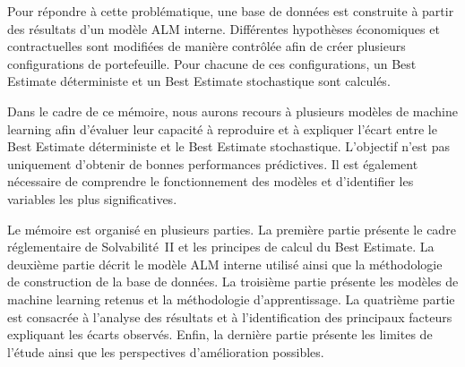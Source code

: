 Pour répondre à cette problématique, une base de données est construite à partir des résultats d'un modèle ALM interne. Différentes hypothèses économiques et contractuelles sont modifiées de manière contrôlée afin de créer plusieurs configurations de portefeuille. Pour chacune de ces configurations, un Best Estimate déterministe et un Best Estimate stochastique sont calculés.

Dans le cadre de ce mémoire, nous aurons recours à plusieurs modèles de machine learning afin d'évaluer leur capacité à reproduire et à expliquer l'écart entre le Best Estimate déterministe et le Best Estimate stochastique. L'objectif n'est pas uniquement d'obtenir de bonnes performances prédictives. Il est également nécessaire de comprendre le fonctionnement des modèles et d'identifier les variables les plus significatives.

Le mémoire est organisé en plusieurs parties. La première partie présente le cadre réglementaire de Solvabilité~II et les principes de calcul du Best Estimate. La deuxième partie décrit le modèle ALM interne utilisé ainsi que la méthodologie de construction de la base de données. La troisième partie présente les modèles de machine learning retenus et la méthodologie d'apprentissage. La quatrième partie est consacrée à l'analyse des résultats et à l'identification des principaux facteurs expliquant les écarts observés. Enfin, la dernière partie présente les limites de l'étude ainsi que les perspectives d'amélioration possibles.